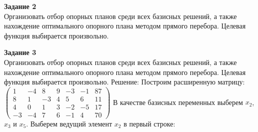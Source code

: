 \documentclass[a4paper,14pt]{extarticle}
\begin{document}
\textbf{Задание 2}\\
Организовать отбор опорных планов среди всех базисных решений, а также нахождение
оптимального опорного плана методом прямого перебора. Целевая функция выбирается
произвольно.\bigbreak

\textbf{Задание 3}\\
Организовать отбор опорных планов среди всех базисных решений, а также нахождение
оптимального опорного плана методом прямого перебора. Целевая функция выбирается
произвольно.\bigbreak
Решение:
Построим расширенную матрицу:\bigbreak
$\begin{pmatrix}
        1  & -4 & 8  & 9 & -3 & -1 & 87 \\
        8  & 1  & -3 & 4 & 5  & 6  & 11 \\
        4  & 0  & 1  & 3 & -2 & -5 & 17 \\
        -3 & -4 & 7  & 6 & -1 & 4  & 70
    \end{pmatrix}$\bigbreak
В качестве базисных переменных выберем $x_2$, $x_3$ и $x_5$. Выберем ведущий элемент $x_2$ в первый строке:\bigbreak
\end{document}
